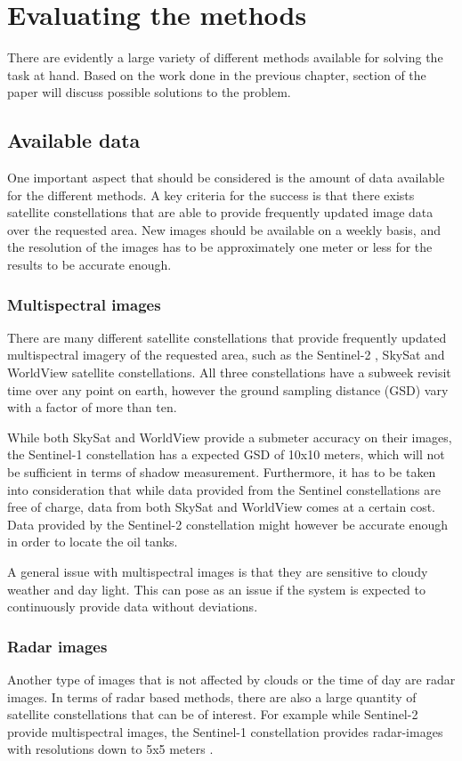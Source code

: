 \chapter{Evaluating the methods}
There are evidently a large variety of different methods available for solving the task at hand. Based on the work done in the previous chapter, section of the paper will discuss possible solutions to the problem. 

\section{Available data}
One important aspect that should be considered is the amount of data available for the different methods. A key criteria for the success is that there exists satellite constellations that are able to provide frequently updated image data over the requested area. New images should be available on a weekly basis, and the resolution of the images has to be approximately one meter or less for the results to be accurate enough.

\subsection*{Multispectral images}
There are many different satellite constellations that provide frequently updated multispectral imagery of the requested area, such as the Sentinel-2 \citep{ESA}, SkySat \citep{Planet2017} and WorldView \citep{DigitalGlobe2017} satellite constellations. All three constellations have a subweek revisit time over any point on earth, however the ground sampling distance (GSD) vary with a factor of more than ten.

While both SkySat and WorldView provide a submeter accuracy on their images, the Sentinel-1 constellation has a expected GSD of 10x10 meters, which will not be sufficient in terms of shadow measurement. Furthermore, it has to be taken into consideration that while data provided from the Sentinel constellations are free of charge, data from both SkySat and WorldView comes at a certain cost. Data provided by the Sentinel-2 constellation might however be accurate enough in order to locate the oil tanks. 

A general issue with multispectral images is that they are sensitive to cloudy weather and day light. This can pose as an issue if the system is expected to continuously provide data without deviations.

\subsection*{Radar images}
Another type of images that is not affected by clouds or the time of day are radar images. In terms of radar based methods, there are also a large quantity of satellite constellations that can be of interest. For example while Sentinel-2 provide multispectral images, the Sentinel-1 constellation provides radar-images with resolutions down to 5x5 meters \citep{ESA}.

